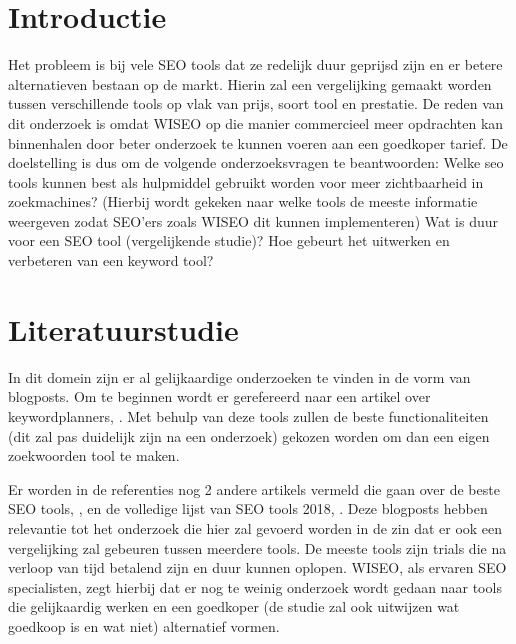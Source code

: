 
\section{Introductie} %
\label{sec:introductie}

Het probleem is bij vele SEO tools dat ze redelijk duur geprijsd zijn en er betere alternatieven bestaan op de markt. Hierin zal een vergelijking gemaakt worden tussen verschillende tools op vlak van prijs, soort tool en prestatie. De reden van dit onderzoek is omdat WISEO op die manier commercieel meer opdrachten kan binnenhalen door beter onderzoek te kunnen voeren aan een goedkoper tarief. De doelstelling is dus om de volgende onderzoeksvragen te beantwoorden: Welke seo tools kunnen best als hulpmiddel gebruikt worden voor meer zichtbaarheid in zoekmachines? (Hierbij wordt gekeken naar welke tools de meeste informatie weergeven zodat SEO'ers zoals WISEO dit kunnen implementeren) Wat is duur voor een SEO tool (vergelijkende studie)? Hoe gebeurt het uitwerken en verbeteren van een keyword tool?


\section{Literatuurstudie}
\label{sec:Literatuurstudie}

In dit domein zijn er al gelijkaardige onderzoeken te vinden in de vorm van blogposts. Om te beginnen wordt er gerefereerd naar een artikel over keywordplanners, \textcite{BKRT2018}. Met behulp van deze tools zullen de beste functionaliteiten (dit zal pas duidelijk zijn na een onderzoek) gekozen worden om dan een eigen zoekwoorden tool te maken.


Er worden in de referenties nog 2 andere artikels vermeld die gaan over de beste SEO tools, \textcite{SEO13}, en de volledige lijst van SEO tools 2018, \textcite{SEOCOMPLETE}. Deze blogposts hebben relevantie tot het onderzoek die hier zal gevoerd worden in de zin dat er ook een vergelijking zal gebeuren tussen meerdere tools. De meeste tools zijn trials die na verloop van tijd betalend zijn en duur kunnen oplopen. WISEO, als ervaren SEO specialisten, zegt hierbij dat er nog te weinig onderzoek wordt gedaan naar tools die gelijkaardig werken en een goedkoper (de studie zal ook uitwijzen wat goedkoop is en wat niet) alternatief vormen. 

